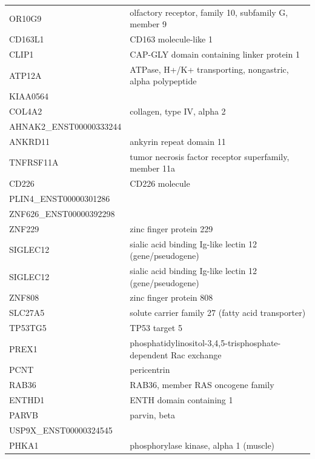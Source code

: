 \documentclass[10pt]{article}
\begin{document}
\begin{table}[ht]
\begin{tabular}{l l}
OR10G9 & olfactory receptor, family 10, subfamily G, member 9 \\
CD163L1 & CD163 molecule-like 1 \\
CLIP1 & CAP-GLY domain containing linker protein 1 \\
ATP12A & ATPase, H+/K+ transporting, nongastric, alpha polypeptide \\
KIAA0564 &  \\
COL4A2 & collagen, type IV, alpha 2 \\
AHNAK2\_ENST00000333244 &  \\
ANKRD11 & ankyrin repeat domain 11 \\
TNFRSF11A & tumor necrosis factor receptor superfamily, member 11a \\
CD226 & CD226 molecule \\
PLIN4\_ENST00000301286 &  \\
ZNF626\_ENST00000392298 &  \\
ZNF229 & zinc finger protein 229 \\
SIGLEC12 & sialic acid binding Ig-like lectin 12 (gene/pseudogene) \\
SIGLEC12 & sialic acid binding Ig-like lectin 12 (gene/pseudogene) \\
ZNF808 & zinc finger protein 808 \\
SLC27A5 & solute carrier family 27 (fatty acid transporter) \\
TP53TG5 & TP53 target 5 \\
PREX1 & phosphatidylinositol-3,4,5-trisphosphate-dependent Rac exchange \\
PCNT & pericentrin \\
RAB36 & RAB36, member RAS oncogene family \\
ENTHD1 & ENTH domain containing 1 \\
PARVB & parvin, beta \\
USP9X\_ENST00000324545 &  \\
PHKA1 & phosphorylase kinase, alpha 1 (muscle) \\
\hline %
\end{tabular} 
\label{table:nonlin} %
\end{table} 
\end{document}
